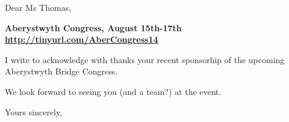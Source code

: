 \documentclass[12pt]{letter}
\begin{document}
\begin{letter}{}
\opening{Dear Ms Thomas,}

{\bf Aberystwyth Congress, August 15th-17th\\
\url{http://tinyurl.com/AberCongress14}}

I write to acknowledge with thanks your recent sponsorhip of the
upcoming Aberystwyth Bridge Congress.

We look forward to seeing you (and a team?) at the event.

\closing{Yours sincerely,}


\end{letter}
\end{document}
